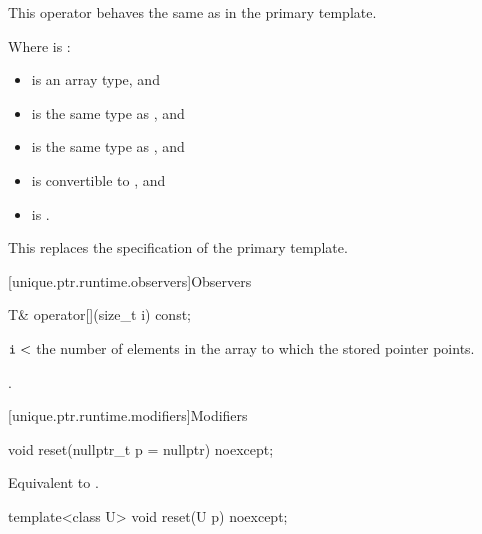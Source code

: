 \begin{itemdescr}
\pnum
This operator behaves the same as in the primary template.

\pnum
\constraints
Where  is :
\begin{itemize}
\item {} is an array type, and
\item {} is the same type as , and
\item {} is the same type as , and
\item {} is convertible to , and
\item {} is .
\end{itemize}

\begin{note}
This replaces the \constraints specification of the primary template.
\end{note}
\end{itemdescr}

[unique.ptr.runtime.observers]{Observers}

%
\begin{itemdecl}
T& operator[](size_t i) const;
\end{itemdecl}

\begin{itemdescr}
\pnum
\expects
$\texttt{i} <$ the
number of elements in the array to which
the stored pointer points.

\pnum
\returns
{}.
\end{itemdescr}

[unique.ptr.runtime.modifiers]{Modifiers}

%
\begin{itemdecl}
void reset(nullptr_t p = nullptr) noexcept;
\end{itemdecl}

\begin{itemdescr}
\pnum
\effects
Equivalent to .
\end{itemdescr}

%
\begin{itemdecl}
template<class U> void reset(U p) noexcept;
\end{itemdecl}

